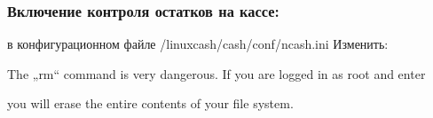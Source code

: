 \documentclass[twoside,11pt,a4paper,notitlepage]{report}
\begin{document}
\sphinxAtStartPar
{}


\subsubsection{Включение контроля остатков на кассе:}
\label{\detokenize{setting:id4}}
\sphinxAtStartPar
в конфигурационном файле /linuxcash/cash/conf/ncash.ini
Изменить:

\begin{sphinxVerbatim}[commandchars=\\\{\}]
  
  


  
  
\end{sphinxVerbatim}

\sphinxAtStartPar
The „rm“ command is very dangerous.  If you are logged
in as root and enter

\begin{sphinxVerbatim}[commandchars=\\\{\}]
 
  
\end{sphinxVerbatim}
\noindent
you will erase the entire contents of your file system.


\begin{productionlist}
\label{\detokenize{setting:grammar-token-try_stmt}}
\label{\detokenize{setting:grammar-token-try1_stmt}}
\label{\detokenize{setting:grammar-token-try2_stmt}}
\end{productionlist}
\end{document}
